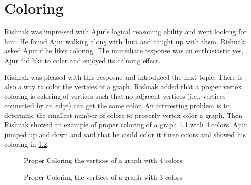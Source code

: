 \chapter{Coloring}
Rishnak  was impressed with Ajur's logical reasoning ability and went looking for him. He found Ajur walking along with Jura and caught up with them. Rishnak asked Ajur if he likes coloring. The immediate response was an enthusiastic yes, . Ajur did like to color and enjoyed its calming effect.

Rishnak was pleased with this resposne and introduced the next topic.  There is also a way to color the vertices of a graph. Rishnak added that a proper vertex coloring is coloring of vertices such that no adjacent vertices (i.e., vertices connected by an edge) can get the same color. An interesting problem is to determine the smallest number of colors to properly vertex color a graph. 
Then Rishnak showed an example of proper coloring of a graph \ref{10g1} with 4 colors. Ajur jumped up and down and said that he could color it three colors and showed his coloring in \ref{10g2}.
\begin{figure}[h]
\begin{center}
\caption{ Proper Coloring the vertices of a graph with 4 colors}\label{10g1}
\end{center}
\end{figure}

\begin{figure}[h]
\begin{center}
\caption{ Proper Coloring the vertices of a graph with 3 colors}\label{10g2}
\end{center}
\end{figure}


